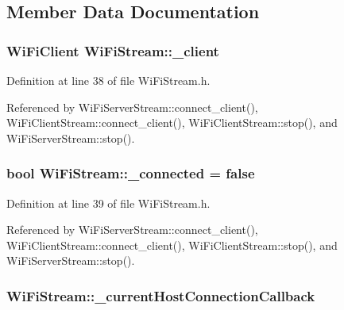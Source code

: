 \subsection{Member Data Documentation}
\subsubsection[{\texorpdfstring{\+\_\+client}{\_client}}]{\setlength{\rightskip}{0pt plus 5cm}Wi\+Fi\+Client Wi\+Fi\+Stream\+::\+\_\+client\hspace{0.3cm}{\ttfamily [protected]}}\hypertarget{class_wi_fi_stream_a260e92c25849c88a0d370672eaf390e7}{}\label{class_wi_fi_stream_a260e92c25849c88a0d370672eaf390e7}


Definition at line 38 of file Wi\+Fi\+Stream.\+h.



Referenced by Wi\+Fi\+Server\+Stream\+::connect\+\_\+client(), Wi\+Fi\+Client\+Stream\+::connect\+\_\+client(), Wi\+Fi\+Client\+Stream\+::stop(), and Wi\+Fi\+Server\+Stream\+::stop().

\subsubsection[{\texorpdfstring{\+\_\+connected}{\_connected}}]{\setlength{\rightskip}{0pt plus 5cm}bool Wi\+Fi\+Stream\+::\+\_\+connected = false\hspace{0.3cm}{\ttfamily [protected]}}\hypertarget{class_wi_fi_stream_abe0341617945c15f2a37d34d7be7e72c}{}\label{class_wi_fi_stream_abe0341617945c15f2a37d34d7be7e72c}


Definition at line 39 of file Wi\+Fi\+Stream.\+h.



Referenced by Wi\+Fi\+Server\+Stream\+::connect\+\_\+client(), Wi\+Fi\+Client\+Stream\+::connect\+\_\+client(), Wi\+Fi\+Client\+Stream\+::stop(), and Wi\+Fi\+Server\+Stream\+::stop().

\subsubsection[{\texorpdfstring{\+\_\+current\+Host\+Connection\+Callback}{\_currentHostConnectionCallback}}]{ Wi\+Fi\+Stream\+::\+\_\+current\+Host\+Connection\+Callback\hspace{0.3cm}{\ttfamily [protected]}}\hypertarget{class_wi_fi_stream_aa5e5f3cc7bf2e91bf5ee9793fe6a1335}{}\label{class_wi_fi_stream_aa5e5f3cc7bf2e91bf5ee9793fe6a1335}


